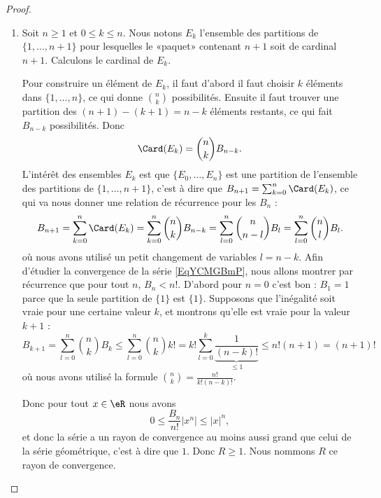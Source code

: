 \begin{proof}
    \begin{enumerate}
        \item
            Soit \( n\geq 1\) et \( 0\leq k\leq n\). Nous notons \( E_k\) l'ensemble des partitions de \( \{ 1,\ldots, n+1 \}\) pour lesquelles le «paquet» contenant \( n+1\) soit de cardinal \( n+1\). Calculons le cardinal de \( E_k\).

            Pour construire un élément de \( E_k\), il faut d'abord il faut choisir \( k\) éléments dans \( \{ 1,\ldots, n \}\), ce qui donne \( n\choose k\) possibilités. Ensuite il faut trouver une partition des \( (n+1)-(k+1)=n-k\) éléments restants, ce qui fait \( B_{n-k}\) possibilités. Donc
            \begin{equation}
                \Card(E_k)={n\choose k}B_{n-k}.
            \end{equation}
            L'intérêt des ensembles \( E_k\) est que \( \{ E_0,\ldots, E_n \}\) est une partition de l'ensemble des partitions de \( \{ 1,\ldots, n+1 \}\), c'est à dire que \( B_{n+1}=\sum_{k=0}^n\Card(E_k)\), ce qui va nous donner une relation de récurrence pour les \( B_n\) :
\begin{equation}
                    B_{n+1}=\sum_{k=0}^n\Card(E_k)
                   =\sum_{k=0}^n{n\choose k}B_{n-k}
                    =\sum_{l=0}^n{n\choose n-l}B_l 
                    =\sum_{l=0}^n{n\choose l}B_l.
\end{equation}
où nous avons utilisé un petit changement de variables \( l=n-k\). Afin d'étudier la convergence de la série \eqref{EqYCMGBmP}, nous allons montrer par récurrence que pour tout \( n\), \( B_n<n!\). D'abord pour \( n=0\) c'est bon : \( B_1=1\) parce que la seule partition de \( \{ 1 \}\) est \( \{ 1 \}\). Supposons que l'inégalité soit vraie pour une certaine valeur \( k\), et montrons qu'elle est vraie pour la valeur \( k+1\) :
\begin{equation}
                    B_{k+1}=\sum_{l=0}^n{n\choose k}B_k
                   \leq \sum_{l=0}^n{n\choose k}k!
                    =k!\sum_{l=0}^k\underbrace{\frac{1}{ (n-k)! }}_{\leq 1}
                    \leq n!(n+1)
                    =(n+1)!
\end{equation}
            où nous avons utilisé la formule \( {n\choose k}=\frac{ n! }{ k!(n-k)! }\).

            Donc pour tout \( x\in \eR\) nous avons
            \begin{equation}
                0\leq \frac{ B_n }{ n! }| x^n |\leq | x |^n,
            \end{equation}
            et donc la série a un rayon de convergence au moins aussi grand que celui de la série géométrique, c'est à dire que \( 1\). Donc \( R\geq 1\). Nous nommons \( R\) ce rayon de convergence.


\end{enumerate}
\end{proof}
